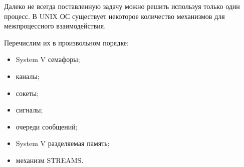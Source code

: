 Далеко не всегда поставленную задачу можно решить используя только один процесс. В UNIX ОС существует некоторое количество механизмов для межпроцессного взаимодействия.

Перечислим их в произвольном порядке:

\begin{itemize}
	\item System V семафоры;
	\item каналы;
	\item сокеты;
	\item сигналы; 
	\item очереди сообщений; 
	\item System V разделяемая память;
	\item механизм STREAMS. 
\end{itemize}
